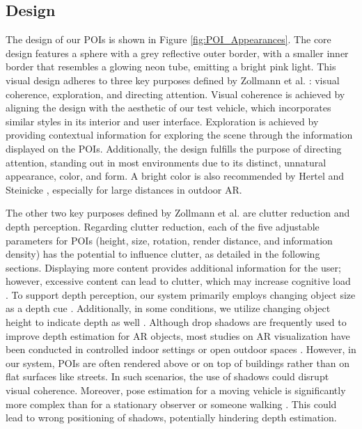 \subsection{Design}
\label{sec:design}
The design of our POIs is shown in Figure \ref{fig:POI_Appearances}. The core design features a sphere with a grey reflective outer border, with a smaller inner border that resembles a glowing neon tube, emitting a bright pink light. This visual design adheres to three key purposes defined by Zollmann et al. \cite{Zollmann2021ArVisTechniques}: visual coherence, exploration, and directing attention. Visual coherence is achieved by aligning the design with the aesthetic of our test vehicle, which incorporates similar styles in its interior and user interface. Exploration is achieved by providing contextual information for exploring the scene through the  information displayed on the POIs. Additionally, the design fulfills the purpose of directing attention, standing out in most environments due to its distinct, unnatural appearance, color, and form. A bright color is also recommended by Hertel and Steinicke \cite{SteinickeArMaritimePois2021}, especially for large distances in outdoor AR.

The other two key purposes defined by Zollmann et al. \cite{Zollmann2021ArVisTechniques} are clutter reduction and depth perception. Regarding clutter reduction, each of the five adjustable parameters for POIs (height, size, rotation, render distance, and information density) has the potential to influence clutter, as detailed in the following sections. Displaying more content provides additional information for the user; however, excessive content can lead to clutter, which may increase cognitive load \cite{kim2011multidimensional}. To support depth perception, our system primarily employs changing object size as a depth cue \cite{goldstein2009sensation}. Additionally, in some conditions, we utilize changing object height to indicate depth as well \cite{goldstein2009sensation}. Although drop shadows are frequently used to improve depth estimation for AR objects, most studies on AR visualization have been conducted in controlled indoor settings or open outdoor spaces \cite{erickson2020reviewOSTAr, Zollmann2021ArVisTechniques}. However, in our system, POIs are often rendered above or on top of buildings rather than on flat surfaces like streets. In such scenarios, the use of shadows could disrupt visual coherence. Moreover, pose estimation for a moving vehicle is significantly more complex than for a stationary observer or someone walking \cite{McGill22PassengXR}. This could lead to wrong positioning of shadows, potentially hindering depth estimation. 


